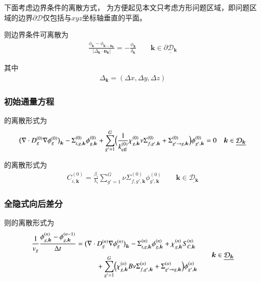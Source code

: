 下面考虑边界条件的离散方式，
为方便起见本文只考虑方形问题区域，即问题区域的边界$\partial \mathcal{D}$仅包括与$xyz$坐标轴垂直的平面。

则边界条件可离散为\TODO
\begin{align}
  \frac{\phi_{\bm{k}}-\phi_{\bm{k}-\bm{n}_{\bm{k}}}}{|\Delta_{\bm{k}}\cdot \bm{n}_{\bm{k}}|}
   = -\frac{\phi_{\bm{k}}}{\delta_{\bm{k}}}
  \qquad \bm{k} \in \underline{\partial \mathcal{D}_{\bm{k}}}
\end{align}

其中
\begin{align}
  \Delta_{\bm{k}} = (\Delta x, \Delta y, \Delta z)
\end{align}

\subsubsection{初始通量方程}

的离散形式为
\begin{align}
  \pb[b]{\nabla\cdot D_g^{(0)} \nabla\phi_g^{(0)}}_{\bm{k}}
   -\Sigma_{t,g,\bm{k}}^{(0)} \phi_{g,\bm{k}}^{(0)}
   +\sum_{g'=1}^G\pb[B]{\frac{1}{k_\mathrm{eff}^{(0)}}\chi_{g,\bm{k}}^{(0)} \nu\Sigma_{f,g',\bm{k}}^{(0)}
                        +\Sigma_{g'\rightarrow g,\bm{k}}^{(0)}}\phi_{g',\bm{k}}^{(0)} =0
  \quad \bm{k} \in \underline{\mathcal{D}_{\bm{k}}}
\end{align}

的离散形式为
\begin{align}
  C_{i,\bm{k}}^{(0)} = \frac{\beta_i}{\lambda_i}
    \sum_{g'=1}^G \nu\Sigma_{f,g',\bm{k}}^{(0)}\phi_{g',\bm{k}}^{(0)}
  \qquad \bm{k} \in \underline{\mathcal{D}_{\bm{k}}}
\end{align}


\subsubsection{全隐式向后差分}


则的离散形式为
\begin{align}
  \begin{aligned}
    \frac{1}{v_g}\frac{\phi_{g,\bm{k}}^{(n)} - \phi_{g,\bm{k}}^{(n-1)}}{\Delta t} 
    &=\pb[b]{\nabla\cdot D_{g}^{(n)} \nabla\phi_{g}^{(n)}}_{\bm{k}}
      -\Sigma_{t,g,\bm{k}}^{(n)} \phi_{g,\bm{k}}^{(n)} + \chi_{g,\bm{k}}^{(n)} S_{C,\bm{k}}^{(n)}\\
    & \hspace{1cm}
      +\sum_{g'=1}^G\pb[B]{\chi_{g,\bm{k}}^{(n)}
        B \nu\Sigma_{f,g',\bm{k}}^{(n)}
         +\Sigma_{g'\rightarrow g,\bm{k}}^{(n)}}\phi_{g',\bm{k}}^{(n)}
  \end{aligned}
  \qquad \bm{k} \in \underline{\mathcal{D}_{\bm{k}}}
  \label{equ:pro.diff.dt.dx.equ1}
\end{align}

